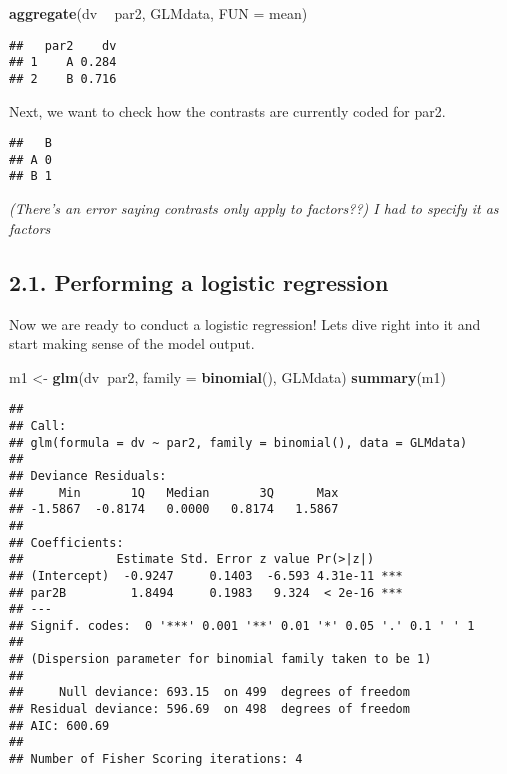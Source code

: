 \documentclass[
]{article}
\newenvironment{Shaded}{\begin{snugshade}}{\end{snugshade}}
\newcommand{\DataTypeTok}[1]{\textcolor[rgb]{0.13,0.29,0.53}{#1}}
\newcommand{\KeywordTok}[1]{\textcolor[rgb]{0.13,0.29,0.53}{\textbf{#1}}}
\newcommand{\NormalTok}[1]{#1}
\newcommand{\OperatorTok}[1]{\textcolor[rgb]{0.81,0.36,0.00}{\textbf{#1}}}
\newcommand{\StringTok}[1]{\textcolor[rgb]{0.31,0.60,0.02}{#1}}
\begin{document}
\begin{Shaded}
\begin{Highlighting}[]
\KeywordTok{aggregate}\NormalTok{(dv }\OperatorTok{~}\StringTok{ }\NormalTok{par2, GLMdata, }\DataTypeTok{FUN =}\NormalTok{ mean)}
\end{Highlighting}
\end{Shaded}

\begin{verbatim}
##   par2    dv
## 1    A 0.284
## 2    B 0.716
\end{verbatim}

Next, we want to check how the contrasts are currently coded for par2.

\begin{Shaded}
\end{Shaded}

\begin{verbatim}
##   B
## A 0
## B 1
\end{verbatim}

\emph{(There's an error saying contrasts only apply to factors??) I had
to specify it as factors}

\hypertarget{performing-a-logistic-regression}{%
\subsection{2.1. Performing a logistic
regression}\label{performing-a-logistic-regression}}

Now we are ready to conduct a logistic regression! Lets dive right into
it and start making sense of the model output.

\begin{Shaded}
\begin{Highlighting}[]
\NormalTok{m1 <-}\StringTok{ }\KeywordTok{glm}\NormalTok{(dv}\OperatorTok{~}\NormalTok{par2,}
          \DataTypeTok{family =} \KeywordTok{binomial}\NormalTok{(), GLMdata)}
\KeywordTok{summary}\NormalTok{(m1)}
\end{Highlighting}
\end{Shaded}

\begin{verbatim}
## 
## Call:
## glm(formula = dv ~ par2, family = binomial(), data = GLMdata)
## 
## Deviance Residuals: 
##     Min       1Q   Median       3Q      Max  
## -1.5867  -0.8174   0.0000   0.8174   1.5867  
## 
## Coefficients:
##             Estimate Std. Error z value Pr(>|z|)    
## (Intercept)  -0.9247     0.1403  -6.593 4.31e-11 ***
## par2B         1.8494     0.1983   9.324  < 2e-16 ***
## ---
## Signif. codes:  0 '***' 0.001 '**' 0.01 '*' 0.05 '.' 0.1 ' ' 1
## 
## (Dispersion parameter for binomial family taken to be 1)
## 
##     Null deviance: 693.15  on 499  degrees of freedom
## Residual deviance: 596.69  on 498  degrees of freedom
## AIC: 600.69
## 
## Number of Fisher Scoring iterations: 4
\end{verbatim}
\end{document}
